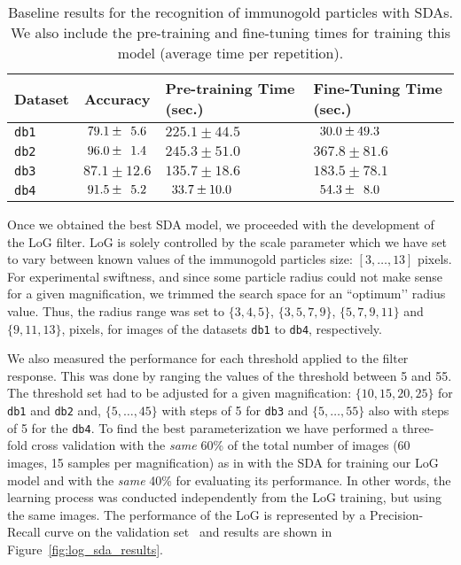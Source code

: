 \documentclass[a4paper,11pt]{article}
\newcommand{\1}{\mathbbm{1}}
\newcommand{\fref}[1]{Figure~\ref{#1}}
\newcommand{\db}[1]{\texttt{#1}}
\newcommand{\p}{\hphantom{1}}
\theoremstyle{plain}
\begin{document}
\begin{table}[!htp]
  \centering
  \caption{Baseline results for the recognition of immunogold particles with \acp{SDA}. We also include the pre-training and fine-tuning times for training this model (average time per repetition).}
  \label{tab:sda_results}
  \begin{tabular}{p{1cm}cp{2cm}p{2cm}}
    \hline \hline
    Dataset & Accuracy & Pre-training Time (sec.) & Fine-Tuning Time (sec.) \\
    \hline
    \db{db1} &  $79.1 \pm \p5.6$ & $ 225.1  \pm 44.5$ & $\p30.0  \pm 49.3$\\
    \db{db2} &  $96.0 \pm \p1.4$ & $ 245.3  \pm 51.0$ & $ 367.8  \pm 81.6$\\
    \db{db3} &  $87.1 \pm  12.6$ & $ 135.7  \pm 18.6$ & $183.5  \pm  78.1$\\
    \db{db4} & $91.5 \pm \p5.2$ & $\p33.7  \pm 10.0$ & $\p54.3 \pm \p8.0$\\
    \hline\hline
  \end{tabular}
\end{table}

Once we obtained the best \ac{SDA} model, we proceeded with the development of the \ac{LoG} filter. \ac{LoG} is solely controlled by the scale parameter which we have set to vary between known values of the immunogold particles size: $[3,\ldots, 13]$ pixels. For experimental swiftness, and since some particle radius could not make sense for a given magnification, we trimmed the search space for an ``optimum’’ radius value. Thus, the radius range was set to $\{3,4,5\}$, $\{3,5,7,9\}$, $\{5,7,9,11\}$ and $\{9,11,13\}$, pixels, for images of the datasets \db{db1} to \db{db4}, respectively.

We also measured the performance for each threshold applied to the filter response. This was done by ranging the values of the threshold between 5 and 55. The threshold set had to be adjusted for a given magnification: $\{10,15,20,25\}$ for \db{db1} and \db{db2} and, $\{5,\ldots,45\}$ with steps of 5 for \db{db3} and $\{5,\ldots,55\}$ also with steps of 5 for the \db{db4}.
To find the best parameterization we have performed a three-fold cross validation with the \emph{same} 60\% of the total number of images (60 images, 15 samples per magnification) as in with the \ac{SDA} for training our \ac{LoG} model and with the \emph{same} 40\% for evaluating its performance. In other words, the learning process was conducted independently from the \ac{LoG} training, but using the same images. The performance of the \ac{LoG} is represented by a Precision-Recall curve on the validation set~\cite{davis2006} and results are shown in \fref{fig:log_sda_results}.
\end{document}
